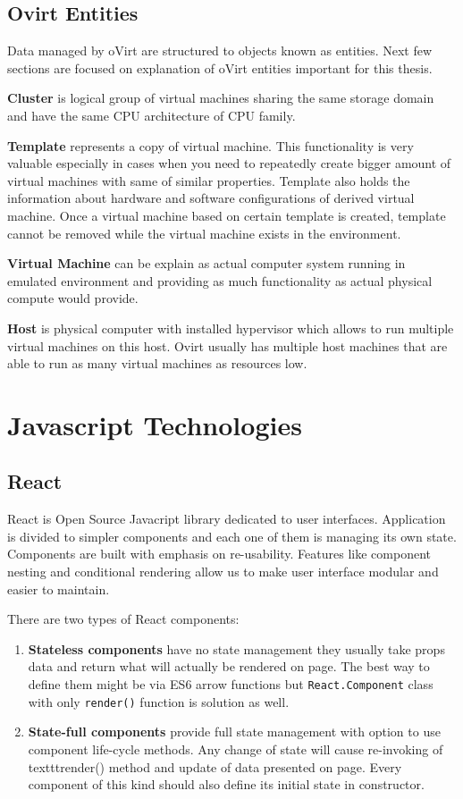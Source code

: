 \section{Ovirt Entities}
Data managed by oVirt are structured to objects known as entities. Next few sections are focused on explanation of oVirt entities important for this thesis.

\textbf{Cluster} is logical group of virtual machines sharing the same storage domain and have the same CPU architecture of CPU family.

\textbf{Template} represents a copy of virtual machine. This functionality is very valuable especially in cases when you need to repeatedly create bigger amount of virtual machines with same of similar properties. Template also holds the information about hardware and software configurations of derived virtual machine. Once a virtual machine based on certain template is created, template cannot be removed while the virtual machine exists in the environment. 

\textbf{Virtual Machine} can be explain as actual computer system running in emulated environment and providing as much functionality as actual physical compute would provide.

\textbf{Host} is physical computer with installed hypervisor which allows to run multiple virtual machines on this host. Ovirt usually has multiple host machines that are able to run as many virtual machines as resources low.


\chapter{Javascript Technologies}

\section{React}
React is Open Source Javacript library dedicated to user interfaces. Application is divided to simpler components and each one of them is managing its own state. Components are built with emphasis on re-usability. Features like component nesting and conditional rendering allow us to make user interface modular and easier to maintain.

There are two types of React components:
\begin{enumerate}
\item \textbf{Stateless components} have no state management they usually take props data and return what will actually be rendered on page. The best way to define them might be via ES6 arrow functions but \texttt{React.Component} class with only \texttt{render()} function is solution as well.

\item \textbf{State-full components} provide full state management with option to use component life-cycle methods. Any change of state will cause re-invoking of texttt{render()} method and update of data presented on page. Every component of this kind should also define its initial state in constructor.
\end{enumerate}

